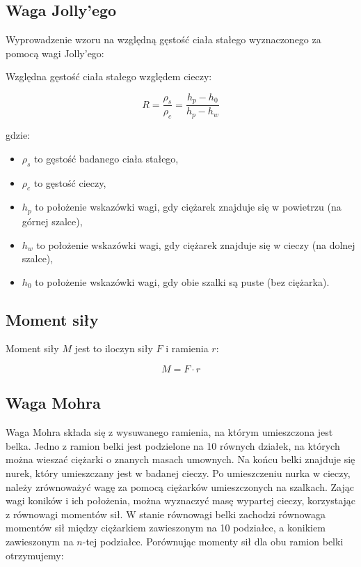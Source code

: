 \documentclass[a4paper,12pt]{article}
\begin{document}
\subsection*{Waga Jolly'ego}

Wyprowadzenie wzoru na względną gęstość ciała stałego wyznaczonego za pomocą wagi Jolly'ego:

Względna gęstość ciała stałego względem cieczy:

\begin{equation}
    \label{eq:wzgledna_gestosc_jolly}
    R = \frac{\rho_{s}}{\rho_c}=  \frac{h_p - h_0}{h_p - h_w}
\end{equation}

gdzie:
\begin{itemize}
    \item $\rho_{s}$ to gęstość badanego ciała stałego,
    \item $\rho_c$ to gęstość cieczy,
    \item $h_p$ to położenie wskazówki wagi, gdy ciężarek znajduje się w powietrzu (na górnej szalce),
    \item $h_w$ to położenie wskazówki wagi, gdy ciężarek znajduje się w cieczy (na dolnej szalce),
    \item $h_0$ to położenie wskazówki wagi, gdy obie szalki są puste (bez ciężarka).
\end{itemize}


\subsection*{Moment siły}

Moment siły $M$ jest to iloczyn siły $F$ i ramienia $r$:

\begin{equation*}
    M = F \cdot r
\end{equation*}

\subsection*{Waga Mohra}

Waga Mohra składa się z wysuwanego ramienia, na którym umieszczona jest belka. Jedno z ramion belki jest podzielone na 10 równych działek, na których można wieszać ciężarki o znanych masach umownych. Na końcu belki znajduje się nurek, który umieszczany jest w badanej cieczy. Po umieszczeniu nurka w cieczy, należy zrównoważyć wagę za pomocą ciężarków umieszczonych na szalkach. Zając wagi koników i ich położenia, można wyznaczyć masę wypartej cieczy, korzystając z równowagi momentów sił.
W stanie równowagi belki zachodzi równowaga momentów sił między ciężarkiem zawieszonym na 10 podziałce, a konikiem zawieszonym na $n$-tej podziałce. Porównując momenty sił dla obu ramion belki otrzymujemy:
\end{document}
